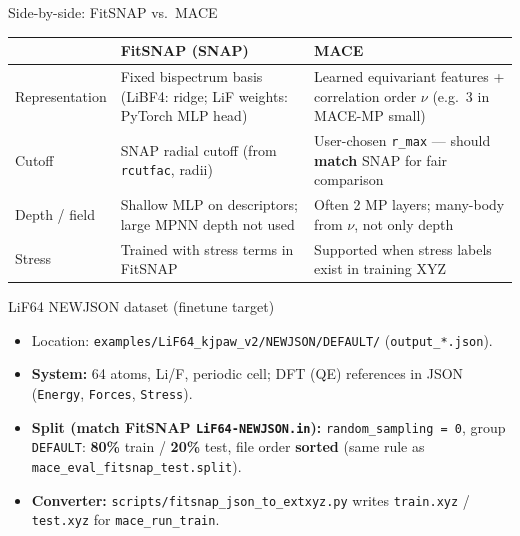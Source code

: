 \documentclass[aspectratio=169]{beamer}
\begin{document}
\begin{frame}{Side-by-side: FitSNAP vs.\ MACE}
  \begin{table}
    \centering
    \small
    \begin{tabular}{@{}p{}p{}p{}@{}}
      \toprule
      & \textbf{FitSNAP (SNAP)} & \textbf{MACE} \\
      \midrule
      Representation & Fixed bispectrum basis (LiBF4: ridge; LiF weights: PyTorch MLP head) & Learned equivariant features + correlation order $\nu$ (e.g.\ 3 in MACE-MP small) \\
      Cutoff & SNAP radial cutoff (from \texttt{rcutfac}, radii) & User-chosen \texttt{r\_max} --- should \textbf{match} SNAP for fair comparison \\
      Depth / field & Shallow MLP on descriptors; large MPNN depth not used & Often 2 MP layers; many-body from $\nu$, not only depth \\
      Stress & Trained with stress terms in FitSNAP & Supported when stress labels exist in training XYZ \\
      \bottomrule
    \end{tabular}
  \end{table}
\end{frame}

\begin{frame}{LiF64 NEWJSON dataset (finetune target)}
  \begin{itemize}
    \item Location: \texttt{examples/LiF64\_kjpaw\_v2/NEWJSON/DEFAULT/} (\texttt{output\_*.json}).
    \item \textbf{System:} 64 atoms, Li/F, periodic cell; DFT (QE) references in JSON (\texttt{Energy}, \texttt{Forces}, \texttt{Stress}).
    \item \textbf{Split (match FitSNAP \texttt{LiF64-NEWJSON.in}):} \texttt{random\_sampling = 0}, group \texttt{DEFAULT}: \textbf{80\%} train / \textbf{20\%} test, file order \textbf{sorted} (same rule as \texttt{mace\_eval\_fitsnap\_test.split}).
    \item \textbf{Converter:} \texttt{scripts/fitsnap\_json\_to\_extxyz.py} writes \texttt{train.xyz} / \texttt{test.xyz} for \texttt{mace\_run\_train}.
  \end{itemize}
\end{frame}
\end{document}
